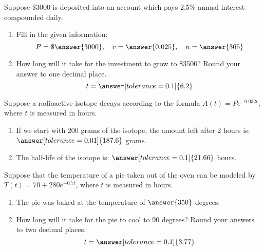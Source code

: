 \documentclass{ximera}
\begin{document}
  \begin{problem}\label{prob:160hom9prob1} 
Suppose \$3000 is deposited into an account which pays 2.5\% annual interest compounded daily.  
 \begin{enumerate}
 \item Fill in the given information:
 $$P=\$\answer{3000},\quad r=\answer{0.025},\quad n=\answer{365}$$
 \item How long will it take for the investment to grow to \$3500?
 Round your answer to one decimal place.
 $$t=\answer[tolerance=0.1]{6.2}$$
 \end{enumerate}
 \end{problem}
 
 \begin{problem}\label{prob:160hom9prob2} 
 Suppose a radioactive isotope decays according to the formula $A(t)=Pe^{-0.032t}$, where $t$ is measured in hours.  
 \begin{enumerate}
     \item 
If we start with 200 grams of the isotope, the amount left after 2 hours is: $\answer[tolerance=0.01]{187.6}$ grams.
\item The half-life of the isotope is: $\answer[tolerance=0.1]{21.66}$ hours.
\end{enumerate}
\end{problem}

\begin{problem}\label{prob:160hom9prob3}
 Suppose that the temperature of a pie taken out of the oven can be modeled by $T(t)=70+280e^{-0.7t}$, where $t$ is measured in hours.
 \begin{enumerate}
     \item The pie was baked at the temperature of $\answer{350}$ degrees.
     \item How long will it take for the pie to cool to 90 degrees?  Round your answers to two decimal places.
     $$t=\answer[tolerance=0.1]{3.77}$$
 \end{enumerate}
 \end{problem}
 
 
\end{document}
